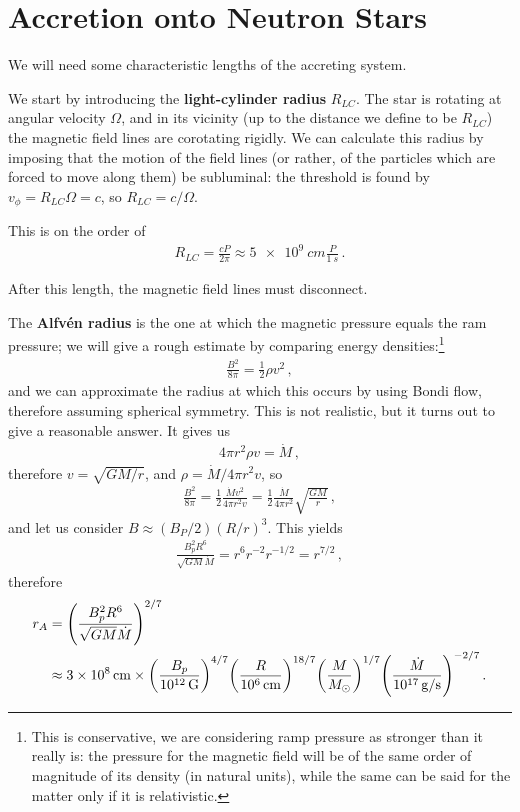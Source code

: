 \documentclass[main.tex]{subfiles}
\begin{document}
\section{Accretion onto Neutron Stars}

We will need some characteristic lengths of the accreting system.

We start by introducing the \textbf{light-cylinder radius} \(R_{LC}\).
The star is rotating at angular velocity \(\Omega \), and in its vicinity (up to the distance we define to be \(R_{LC}\)) the magnetic field lines are corotating rigidly. 
We can calculate this radius by imposing that the motion of the field lines (or rather, of the particles which are forced to move along them) be subluminal: the threshold is found by \(v_\phi = R_{LC} \Omega = c\), so \(R_{LC} = c/  \Omega \).

This is on the order of 
%
\begin{align}
R_{LC} = \frac{cP}{2 \pi } \approx \SI{5e9}{cm} \frac{P}{\SI{1}{s}}
\,.
\end{align}

After this length, the magnetic field lines must disconnect. 

The \textbf{Alfvén radius} is the one at which the magnetic pressure equals the ram pressure; we will give a rough estimate by comparing energy densities:\footnote{This is conservative, we are considering ramp pressure as stronger than it really is: the pressure for the magnetic field will be of the same order of magnitude of its density (in natural units), while the same can be said for the matter only if it is relativistic.}
%
\begin{align}
\frac{B^2}{8 \pi } = \frac{1}{2} \rho v^2
\,,
\end{align}
%
and we can approximate the radius at which this occurs by using Bondi flow, therefore assuming spherical symmetry. This is not realistic, but it turns out to give a reasonable answer.
It gives us 
%
\begin{align}
4 \pi r^2\rho v = \dot{M}
\,,
\end{align}
%
therefore \(v = \sqrt{GM /r}\), and \(\rho = \dot{M} / 4 \pi r^2 v \), so 
%
\begin{align}
\frac{B^2}{8 \pi } = \frac{1}{2} \frac{\dot{M} v^2}{4 \pi r^2v}
= \frac{1}{2} \frac{\dot{M}}{4 \pi r^2} \sqrt{ \frac{GM}{r}}
\,,
\end{align}
%
and let us consider \(B \approx (B_P /2) (R / r)^3\). 
This yields 
%
\begin{align}
\frac{B_p^2 R^{6}}{\sqrt{GM} \dot{M}} = r^{6} r^{-2} r^{-1/2} = r^{7/2}
\,,
\end{align}
%
therefore 
%
\begin{align}
r_A &= \qty(\frac{B_p^2 R^{6}}{\sqrt{GM} \dot{M}})^{2/7}  \\
&\approx \SI{3e8}{cm} \times \qty(\frac{B_p}{\SI{e12}{G}})^{4/7}
\qty(\frac{R}{\SI{e6}{cm}})^{18/7} \qty(\frac{M}{M_{\odot}})^{1/7} 
\qty(\frac{\dot{M}}{\SI{e17}{g/s}})^{-2/7}
\,.
\end{align}
\end{document}
